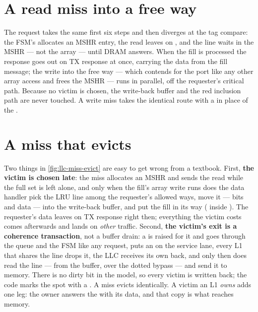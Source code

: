 \section{A read miss into a free way}


The request takes the same first six steps and then diverges at the tag compare: the FSM's
 allocates an MSHR entry, the read leaves on , and the line waits in the
MSHR --- not the array --- until DRAM answers. When the fill is processed the response goes out
on TX response at once, carrying the data from the fill message; the write into the free way
--- which contends for the port like any other array access and frees the MSHR --- runs in
parallel, off the requester's critical path. Because no victim is chosen, the write-back buffer
and the red inclusion path are never touched. A write miss takes the identical route with a
 in place of the .

\section{A miss that evicts}


Two things in \cref{fig:llc-miss-evict} are easy to get wrong from a textbook. First,
\textbf{the victim is chosen late}: the miss allocates an MSHR and sends the read while the full
set is left alone, and only when the fill's array write runs does the data handler pick the LRU
line among the requester's allowed ways, move it --- bits and data --- into the write-back
buffer, and put the fill in its way ( inside ). The
requester's data leaves on TX response right then; everything the victim costs comes afterwards
and lands on \emph{other} traffic. Second, \textbf{the victim's exit is a coherence transaction},
not a buffer drain: a  is raised for it and goes through the queue and the FSM
like any request,  puts an  on the service lane, every L1 that shares the
line drops it, the LLC receives its own  back, and only then does  read
the line --- from the buffer, over the dotted bypass --- and send it to memory. There is no dirty
bit in the model, so every victim is written back; the code marks the spot with a .
A  miss evicts identically. A victim an L1 \emph{owns} adds one leg: the owner answers
the  with its data, and that copy is what reaches memory.

